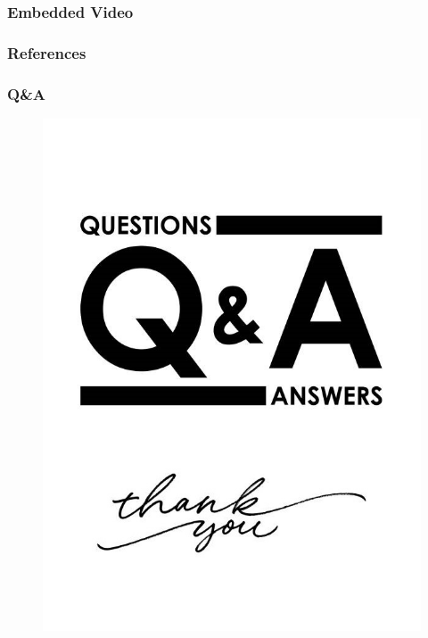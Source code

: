 \documentclass [xcolor={dvipsnames}, t] {beamer}
\begin{document}
\begin{frame}
	\frametitle{Embedded Video}  
	\begin{center}
	\end{center}
\end{frame}

\begin{frame} 
	\frametitle{References}        
	\nocite{*}
	
\end{frame}



\begin{frame}
	\frametitle{Q\&A}
	\begin{figure}
		\centering
		\includegraphics[scale=1]{fig/QandA.jpg}
	\end{figure}
\end{frame}

  
\end{document}
